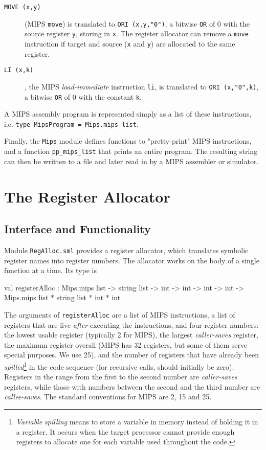 \documentclass[11pt,a4paper]{article}
\newcommand{\codesize}{\scriptsize}
\newcommand{\cd}[1]{{{\codesize\tt #1}}}
\begin{document}
\begin{description}

\item[{\tt MOVE (x,y)}] (MIPS \cd{move}) is translated to {\tt ORI (x,y,"0")},
	a bitwise \cd{OR} of $0$ with the source register \cd{y}, storing in \cd{x}.
	The register allocator can remove a \cd{move} instruction if target
	and source (\cd{x} and \cd{y}) are allocated to the same register.

\item[{\tt LI (x,k)}], the MIPS \emph{load-immediate} instruction \cd{li}, 
	is translated to {\tt ORI (x,"0",k)}, a bitwise \cd{OR} of $0$ with 
	the constant \cd{k}.

\end{description}

\noindent
A MIPS assembly program is represented simply as a list of these instructions, i.e. 
\cd{type MipsProgram = Mips.mips~list}. 

Finally, the {\tt Mips} module defines
functions to "pretty-print" MIPS instructions, and a function \cd{pp\_mips\_list}
that prints an entire program. The resulting string can then be written to a file 
and later read in by a MIPS assembler or simulator.

\section{The Register Allocator}
\subsection{Interface and Functionality}
Module  \cd{RegAlloc.sml} provides a register allocator, which translates 
symbolic register names into register numbers. The allocator works on 
the body of a single function at a time. Its type is

\begin{code}[frame=lines, label=from \textit{RegAlloc.sig}]
  val registerAlloc : 
    Mips.mips list -> string list -> int -> int -> int -> int
    -> Mips.mips list * string list * int * int
\end{code}

The arguments of \cd{registerAlloc} are a list of MIPS instructions,
a list of registers that are live \emph{after} executing the instructions,
and four register numbers: the lowest usable register (typically 2 for MIPS),
the largest \emph{caller-saves} register, the maximum register overall
(MIPS has 32 registers, but some of them serve special purposes. We use 25),
and the number of registers that have already been \emph{spilled}\footnote{
\emph{Variable spilling} means to store a variable in memory instead of holding
it in a register. It occurs when the target processor cannot provide enough
registers to allocate one for each variable used throughout the code.}
in the code sequence (for recursive calls, should initially be zero).
Registers in the range from the first to the second number are \emph{caller-saves}
registers, while those with numbers between the second and the third number are
\emph{callee-saves}. The standard conventions for MIPS are 2, 15 and 25.
\end{document}
